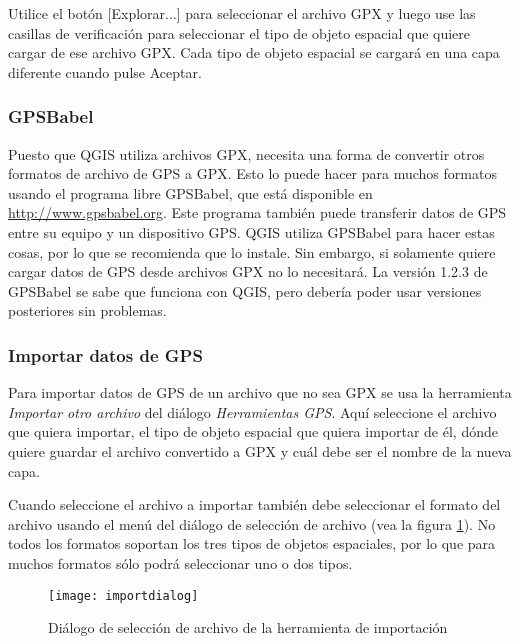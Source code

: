 Utilice el botón {[}Explorar...{]} para seleccionar el archivo GPX y luego use las casillas de verificación para seleccionar el tipo de objeto espacial que quiere cargar de ese archivo GPX. Cada tipo de objeto espacial se cargará en una capa diferente cuando pulse Aceptar.

\subsubsection{GPSBabel}

Puesto que QGIS utiliza archivos GPX, necesita una forma de convertir otros formatos de archivo de GPS a GPX. Esto lo puede hacer para muchos formatos usando el programa libre GPSBabel, que está disponible en \url{http://www.gpsbabel.org}. Este programa también puede transferir datos de GPS entre su equipo y un dispositivo GPS. QGIS utiliza GPSBabel para hacer estas cosas, por lo que se recomienda que lo instale. Sin embargo, si solamente quiere cargar datos de GPS desde archivos GPX no lo necesitará. La versión 1.2.3 de GPSBabel se sabe que funciona con QGIS, pero debería poder usar versiones posteriores sin problemas.


\subsubsection{Importar datos de GPS}

Para importar datos de GPS de un archivo que no sea GPX se usa la herramienta  \emph{Importar otro archivo} del diálogo \emph{Herramientas GPS}. Aquí seleccione el archivo que quiera importar, el tipo de objeto espacial que quiera importar de él, dónde quiere guardar el archivo convertido a GPX y cuál debe ser el nombre de la nueva capa.

Cuando seleccione el archivo a importar también debe seleccionar el formato
del archivo usando el menú del diálogo de selección de archivo (vea la figura
\ref{figure importdialog}). No todos los formatos soportan los tres tipos de
objetos espaciales, por lo que para muchos formatos sólo podrá seleccionar uno o 
dos tipos.

\begin{figure}[ht]
   \begin{center}
\caption{\label{figure importdialog}Diálogo de selección de archivo de la herramienta de importación}
\texttt{[image: importdialog]}
   \end{center}
\end{figure}

